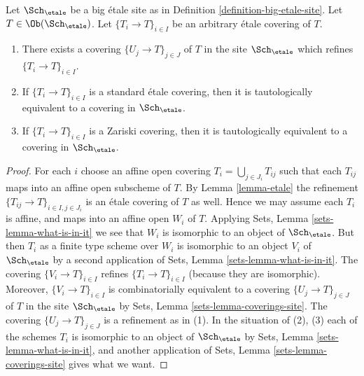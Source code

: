\begin{lemma}
\label{lemma-etale-induced}
Let $\Sch_\etale$ be a big \'etale site as in
Definition \ref{definition-big-etale-site}.
Let $T \in \Ob(\Sch_\etale)$.
Let $\{T_i \to T\}_{i \in I}$ be an arbitrary \'etale covering of $T$.
\begin{enumerate}
\item There exists a covering $\{U_j \to T\}_{j \in J}$ of $T$ in the site
$\Sch_\etale$ which refines $\{T_i \to T\}_{i \in I}$.
\item If $\{T_i \to T\}_{i \in I}$ is a standard \'etale covering, then
it is tautologically equivalent to a covering in $\Sch_\etale$.
\item If $\{T_i \to T\}_{i \in I}$ is a Zariski covering, then
it is tautologically equivalent to a covering in $\Sch_\etale$.
\end{enumerate}
\end{lemma}

\begin{proof}
For each $i$ choose an affine open covering $T_i = \bigcup_{j \in J_i} T_{ij}$
such that each $T_{ij}$ maps into an affine open subscheme of $T$. By
Lemma \ref{lemma-etale}
the refinement $\{T_{ij} \to T\}_{i \in I, j \in J_i}$ is an \'etale covering
of $T$ as well. Hence we may assume each $T_i$ is affine, and maps into
an affine open $W_i$ of $T$. Applying
Sets, Lemma \ref{sets-lemma-what-is-in-it}
we see that $W_i$ is isomorphic to an object of $\Sch_\etale$.
But then $T_i$ as a finite type scheme over $W_i$
is isomorphic to an object $V_i$ of $\Sch_\etale$ by a second
application of
Sets, Lemma \ref{sets-lemma-what-is-in-it}.
The covering $\{V_i \to T\}_{i \in I}$ refines $\{T_i \to T\}_{i \in I}$
(because they are isomorphic).
Moreover, $\{V_i \to T\}_{i \in I}$ is combinatorially equivalent to a
covering $\{U_j \to T\}_{j \in J}$ of $T$ in the site
$\Sch_\etale$ by
Sets, Lemma \ref{sets-lemma-coverings-site}.
The covering $\{U_j \to T\}_{j \in J}$ is a refinement as in (1).
In the situation of (2), (3) each of the
schemes $T_i$ is isomorphic to an object of $\Sch_\etale$ by
Sets, Lemma \ref{sets-lemma-what-is-in-it},
and another application of
Sets, Lemma \ref{sets-lemma-coverings-site}
gives what we want.
\end{proof}


